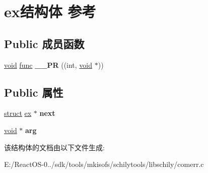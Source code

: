 \hypertarget{structex}{}\section{ex结构体 参考}
\label{structex}
\subsection*{Public 成员函数}
\begin{DoxyCompactItemize}
\item 
\mbox{\label{structex_a2897b9925c6cc7fcbba11dfaa7369ddf}} 
\hyperlink{interfacevoid}{void} \hyperlink{interfacevoid}{func} {\bfseries \+\_\+\+\_\+\+PR} ((int, \hyperlink{interfacevoid}{void} $\ast$))
\end{DoxyCompactItemize}
\subsection*{Public 属性}
\begin{DoxyCompactItemize}
\item 
\mbox{\label{structex_ac1b4972f4fab9d19a80e68859893072d}} 
\hyperlink{interfacestruct}{struct} \hyperlink{structex}{ex} $\ast$ {\bfseries next}
\item 
\mbox{\label{structex_ad6024c90cb8da345879c5200b71064a8}} 
\hyperlink{interfacevoid}{void} $\ast$ {\bfseries arg}
\end{DoxyCompactItemize}


该结构体的文档由以下文件生成\+:\begin{DoxyCompactItemize}
\item 
E\+:/\+React\+O\+S-\/0../sdk/tools/mkisofs/schilytools/libschily/comerr.\+c\end{DoxyCompactItemize}
